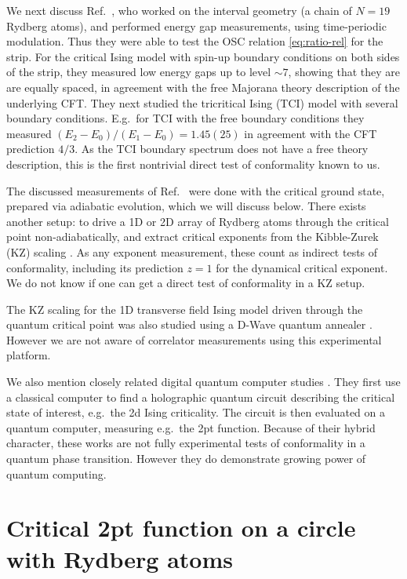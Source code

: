 \documentclass[a4paper,12pt]{article}
\theoremstyle{remark}
\theoremstyle{theorem}
\begin{document}
We next discuss Ref.~{\cite{Sun:2026aqf}}, who worked on the interval geometry
(a chain of $N = 19$ Rydberg atoms), and performed energy gap measurements,
using time-periodic modulation. Thus they were able to test the OSC relation
\eqref{eq:ratio-rel} for the strip. For the critical Ising model with spin-up
boundary conditions on both sides of the strip, they measured low energy gaps
up to level $\sim 7$, showing that they are are equally spaced, in agreement
with the free Majorana theory description of the underlying CFT. They next
studied the tricritical Ising (TCI) model with several boundary conditions.
E.g.~for TCI with the free boundary conditions they measured $(E_2 - E_0) /
(E_1 - E_0) = 1.45 (25)$ in agreement with the CFT prediction $4 / 3$. As the
TCI boundary spectrum does not have a free theory description, this is the
first nontrivial direct test of conformality known to us.

The discussed measurements of
Ref.~{\cite{Fang:2024uyf,Emperauger:2025raf,Sun:2026aqf}} were done with the
critical ground state, prepared via adiabatic evolution, which we will discuss
below. There exists another setup: to drive a 1D
{\cite{Keesling:2018ish,Zhang:2025xkp}} or 2D
{\cite{Ebadi:2020ldi,Manovitz:2024hif}} array of Rydberg atoms through the
critical point non-adiabatically, and extract critical exponents from the
Kibble-Zurek (KZ) scaling {\cite{delCampo:2013nla}}. As any exponent
measurement, these count as indirect tests of conformality, including its
prediction $z = 1$ for the dynamical critical exponent. We do not know if one
can get a direct test of conformality in a KZ setup.

The KZ scaling for the 1D transverse field Ising model driven through the
quantum critical point was also studied using a D-Wave quantum annealer
{\cite{King:2022phl}}. However we are not aware of correlator measurements
using this experimental platform.

We also mention closely related digital quantum computer studies
{\cite{Anand:2022cdi,Dborin:2022zdd,Haghshenas:2023bje}}. They first use a
classical computer to find a holographic quantum circuit describing the
critical state of interest, e.g.~the 2d Ising criticality. The circuit is then
evaluated on a quantum computer, measuring e.g.~the 2pt function. Because of
their hybrid character, these works are not fully experimental tests of
conformality in a quantum phase transition. However they do demonstrate
growing power of quantum computing.

\section{Critical 2pt function on a circle with Rydberg atoms}\label{sec:prop}
\end{document}

